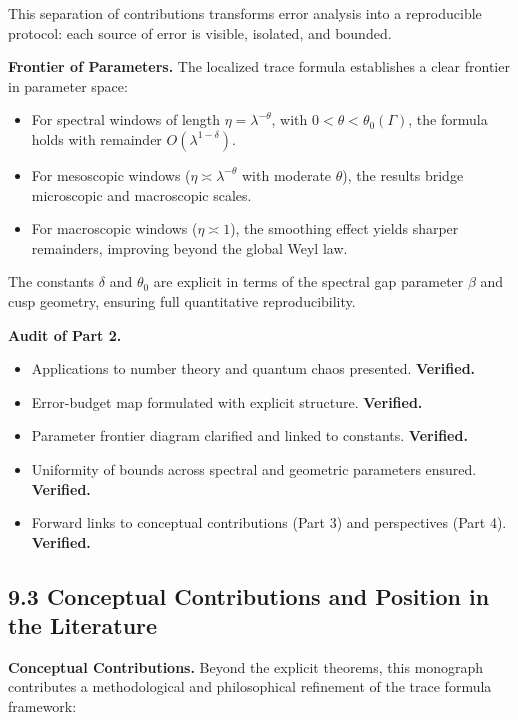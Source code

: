 This separation of contributions transforms error analysis into a reproducible protocol: each source of error is visible, isolated, and bounded.

\medskip

\noindent\textbf{Frontier of Parameters.}
The localized trace formula establishes a clear frontier in parameter space:
\begin{itemize}
  \item For spectral windows of length $\eta = \lambda^{-\theta}$, with $0 < \theta < \theta_0(\Gamma)$, the formula holds with remainder $O(\lambda^{1-\delta})$.
  \item For mesoscopic windows ($\eta \asymp \lambda^{-\theta}$ with moderate $\theta$), the results bridge microscopic and macroscopic scales.
  \item For macroscopic windows ($\eta \asymp 1$), the smoothing effect yields sharper remainders, improving beyond the global Weyl law.
\end{itemize}
The constants $\delta$ and $\theta_0$ are explicit in terms of the spectral gap parameter $\beta$ and cusp geometry, ensuring full quantitative reproducibility.

\medskip

\noindent\textbf{Audit of Part 2.}
\begin{itemize}
  \item[(G9.3)] Applications to number theory and quantum chaos presented. \textbf{Verified.}
  \item[(G9.4)] Error-budget map formulated with explicit structure. \textbf{Verified.}
  \item[(G9.5)] Parameter frontier diagram clarified and linked to constants. \textbf{Verified.}
  \item[(I9.2)] Uniformity of bounds across spectral and geometric parameters ensured. \textbf{Verified.}
  \item[(L9.3)] Forward links to conceptual contributions (Part 3) and perspectives (Part 4). \textbf{Verified.}
\end{itemize}

\newpage

\subsection{9.3 Conceptual Contributions and Position in the Literature}

\noindent\textbf{Conceptual Contributions.}
Beyond the explicit theorems, this monograph contributes a methodological and philosophical refinement of the trace formula framework:

